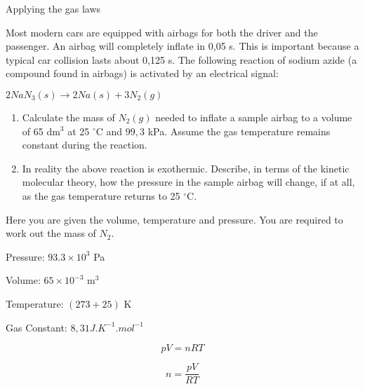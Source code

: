 \begin{wex}{Applying the gas laws\\}{
Most modern cars are equipped with airbags for both the driver and the passenger. An airbag will completely inflate in 0,05 s. This is important because a typical car collision lasts about 0,125 s. The following reaction of sodium azide (a compound found in airbags) is activated by an electrical signal: 

\begin{center} 
\rm${2NaN_3(s) \rightarrow 2Na (s) + 3N_2(g)}$
\end{center}

	\begin{enumerate} 
	\item Calculate the mass of $N_2(g)$ needed to inflate a sample airbag to a volume of 65 dm$^3$ at 25 $^{\circ}$C and $99,3$ kPa. Assume the gas temperature remains constant during the reaction. 
	\item In reality the above reaction is exothermic. Describe, in terms of the kinetic molecular theory, how the pressure in the sample airbag will change, if at all, as the gas temperature returns to 25 $^{\circ}$C. 
	\end{enumerate} 
}

{

Here you are given the volume, temperature and pressure. You are required to work out the mass of $N_2$.\\
}


{


Pressure: $93.3 \times 10^3$ Pa

Volume: $65 \times 10^{-3}$ m$^{3}$

Temperature: $(273+25)$ K

Gas Constant: $8,31 J.K^{-1}.mol^{-1}$\\
}

{

\begin{equation*}
pV = nRT
\end{equation*}
}

{

\begin{equation*}
n=\frac{pV}{RT}
\end{equation*}
}

{ 

}
\end{wex}
